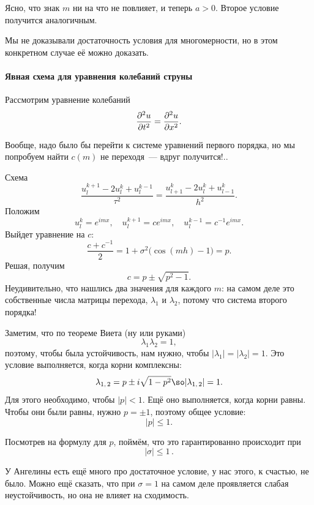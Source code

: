 \documentclass{trlnotes}
\begin{document}
    Ясно, что знак $m$ ни на что не повлияет, и теперь $a > 0$. Второе условие получится аналогичным.

    \begin{rem}
        Мы не доказывали достаточность условия для многомерности, но в этом конкретном случае её можно доказать.
    \end{rem}

    \paragraph{Явная схема для уравнения колебаний струны}

    Рассмотрим уравнение колебаний
    \[
        \dfrac{\partial^2 u}{\partial t^2} = \dfrac{\partial^2 u}{\partial x^2}.
    \]

    Вообще, надо было бы перейти к системе уравнений первого порядка, но мы попробуем найти $c(m)$ не переходя~--- вдруг получится!..

    Схема
    \[
        \dfrac{u_l^{k + 1} - 2u_l^k + u_l^{k-1}}{\tau^2} = \dfrac{u^k_{l+1} - 2u^k_l + u^k_{l-1}}{h^2}.
    \]
    Положим
    \[
        u_l^k = e^{imx}, \quad u_l^{k+1} = ce^{imx}, \quad u_l^{k-1} = c^{-1} e^{imx}.
    \]
    Выйдет уравнение на $c$:
    \[
        \dfrac{c + c^{-1}}{2} = 1 + \sigma^2\big(\cos(mh) - 1\big) = p.
    \]
    Решая, получим
    \[
        c = p \pm \sqrt{p^2 - 1}.
    \]
    Неудивительно, что нашлись два значения для каждого $m$: на самом деле это собственные числа матрицы перехода, $\lambda_1$ и $\lambda_2$, потому что система второго порядка!

    Заметим, что по теореме Виета (ну или руками) 
    \[
        \lambda_1 \lambda_2 = 1,
    \]
    поэтому, чтобы была устойчивость, нам нужно, чтобы $|\lambda_1| = |\lambda_2| = 1$. Это условие выполняется, когда корни комплексны:
    \[
        \lambda_{1, \, 2} = p \pm i\sqrt{1 - p^2} \so |\lambda_{1, \, 2}| = 1.
    \]
    Для этого необходимо, чтобы $|p| < 1$. Ещё оно выполняется, когда корни равны. Чтобы они были равны, нужно $p = \pm 1$, поэтому общее условие:
    \[
        |p| \leqslant 1.
    \]

    Посмотрев на формулу для $p$, поймём, что это гарантированно происходит при 
    \[
        \boxed{|\sigma| \leqslant 1}\,.
    \]

    \begin{rem}
        У Ангелины есть ещё много про достаточное условие, у нас этого, к счастью, не было. Можно ещё сказать, что при $\sigma = 1$ на самом деле проявляется слабая неустойчивость, но она не влияет на сходимость.
    \end{rem}
\end{document}
